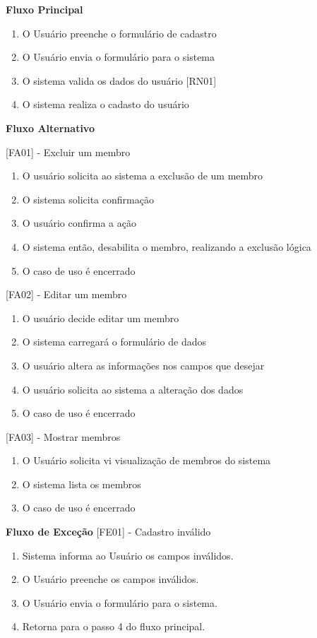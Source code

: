 \begin{apendicesenv}
\textbf{Fluxo Principal}
\begin{enumerate}
  \item{O Usuário preenche o formulário de cadastro} %
  \item{O Usuário envia o formulário para o sistema} %
  \item{O sistema valida os dados do usuário [RN01]} %
  \item{O sistema realiza o cadasto do usuário} %
\end{enumerate}

\textbf{Fluxo Alternativo}

[FA01] - Excluir um membro
\begin{enumerate}
  \item{O usuário solicita ao sistema a exclusão de um membro}
  \item{O sistema solicita confirmação}
  \item{O usuário confirma a ação}
  \item{O sistema então, desabilita o membro, realizando a exclusão lógica}
  \item{O caso de uso é encerrado}
\end{enumerate}

[FA02] - Editar um membro
\begin{enumerate}
  \item{O usuário decide editar um membro}
  \item{O sistema carregará o formulário de dados}
  \item{O usuário altera as informações nos campos que desejar}
  \item{O usuário solicita ao sistema a alteração dos dados}
  \item{O caso de uso é encerrado}
\end{enumerate}

[FA03] - Mostrar membros
\begin{enumerate}
  \item{O Usuário solicita vi visualização de membros do sistema}
  \item{O sistema lista os membros}
  \item{O caso de uso é encerrado}
\end{enumerate}

\textbf{Fluxo de Exceção}
[FE01] - Cadastro inválido
\begin{enumerate}
\item{Sistema informa ao Usuário os campos inválidos.}
\item{O Usuário preenche os campos inválidos.}
\item{O Usuário envia o formulário para o sistema.}
\item{Retorna para o passo 4 do fluxo principal.}
\end{enumerate}



\end{apendicesenv}
